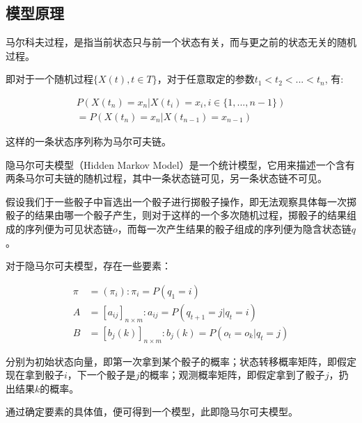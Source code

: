 \documentclass[hyperref]{ctexart}
\begin{document}
\begin{multicols}{2}
	\subsection{模型原理}
	马尔科夫过程，是指当前状态只与前一个状态有关，而与更之前的状态无关的随机过程。\\ \par
    即对于一个随机过程$\{X(t), t\in T\}$，对于任意取定的参数$t_1 < t_2 < ... < t_n$,
    \noindent 有: \par
	\begin{equation*}
	\begin{aligned}
	    P(X(t_n) = x_n | X(t_i) = x_i, i \in \{1,...,n - 1\})\\ = 
		P(X(t_n) = x_n | X(t_{n-1}) = x_{n - 1})
	\end{aligned}
	\end{equation*}\par
	\indent\par 这样的一条状态序列称为马尔可夫链。\par
	隐马尔可夫模型（Hidden Markov Model）是一个统计模型，它用来描述一个含有两条马尔可夫链的随机过程，其中一条状态链可见，另一条状态链不可见。\par
    假设我们于一些骰子中盲选出一个骰子进行掷骰子操作，即无法观察具体每一次掷骰子的结果由哪一个骰子产生，则对于这样的一个多次随机过程，掷骰子的结果组成的序列便为可见状态链$o$，而每一次产生结果的骰子组成的序列便为隐含状态链$q$。\par
    对于隐马尔可夫模型，存在一些要素：\par \indent\par
    \noindent
    \begin{equation*}
    \begin{aligned}
        \pi &= (\pi_i):\pi_i = P(q_1 = i)\\
        A &= [a_{ij}]_{n \times m} :a_{ij} = P(q_{t+1} = j|q_t = i)\\
        B &= [b_j(k)]_{n \times m}: b_j(k) = P(o_t = o_k|q_t = j)
    \end{aligned}
    \end{equation*}\par \indent\par
    分别为初始状态向量，即第一次拿到某个骰子的概率；状态转移概率矩阵，即假定现在拿到骰子$i$，下一个骰子是$j$的概率；观测概率矩阵，即假定拿到了骰子$j$，扔出结果$k$的概率。\par
    通过确定要素的具体值，便可得到一个模型，此即隐马尔可夫模型。

\end{multicols}
\end{document}
